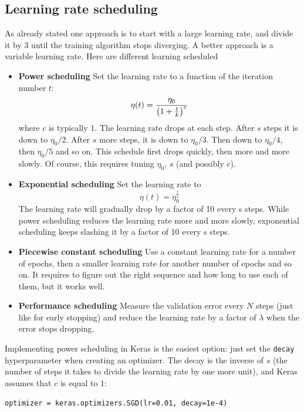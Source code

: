 \documentclass[12pt, letterpaper]{article}
\theoremstyle{definition}
\DeclarePairedDelimiter\autobracket{(}{)}
\newcommand{\br}[1]{\autobracket*{#1}}
\let\tb\textbf
\let\cd\lstinline
\begin{document}
\subsection{Learning rate scheduling}
As already stated one approach is to start with a large learning rate, and divide it by 3 until the training algorithm stops diverging. A better approach is a variable learning rate. Here are different learning scheduled
\begin{itemize}
\item \tb{Power scheduling} Set the learning rate to a function of the iteration number $t$:
\begin{equation}
\eta(t) = \frac{\eta_0}{\br{1+\frac{t}{k}}^c}
\end{equation}
where $c$ is typically $1$. The learning rate drops at each step. After $s$ steps it is down to $\eta_0 / 2$. After $s$ more steps, it is down to $\eta_0 / 3$. Then down to $\eta_0 / 4$, then $\eta_0 / 5$ and so on. This schedule first drops quickly, then more and more slowly. Of course, this requires tuning $\eta_0$, $s$ (and possibly $c$).
\item \tb{Exponential scheduling} Set the learning rate to
\begin{equation}
\eta(t) = \eta_0 ^{\frac{t}{s}}
\end{equation}
The learning rate will gradually drop by a factor of 10 every s steps. While power scheduling reduces the learning rate more and more slowly, exponential scheduling keeps slashing it by a factor of 10 every s steps.
\item \tb{Piecewise constant scheduling} Use a constant learning rate for a number of epochs, then a smaller learning rate for another number of epochs and so on. It requires to figure out the right sequence and how long to use each of them, but it works well.
\item \tb{Performance scheduling} Measure the validation error every $N$ steps (just like for early stopping) and reduce the learning rate by a factor of $\lambda$ when the error stops dropping.
\end{itemize}
Implementing power scheduling in Keras is the easiest option: just set the \cd+decay+ hyperparameter when creating an optimizer. The decay is the inverse of $s$ (the number of steps it takes to divide the learning rate by one more unit), and Keras assumes that $c$ is equal to $1$:
\begin{lstlisting}
optimizer = keras.optimizers.SGD(lr=0.01, decay=1e-4)
\end{lstlisting}
\end{document}
